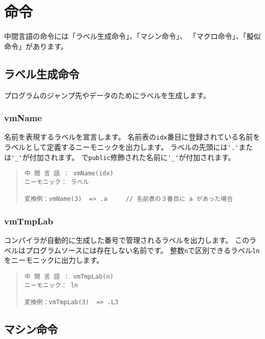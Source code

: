 \section{命令}

中間言語の命令には「ラベル生成命令」、「マシン命令」、
「マクロ命令」、「擬似命令」があります。

\subsection{ラベル生成命令}

プログラムのジャンプ先やデータのためにラベルを生成します。

\subsubsection{vmName}

名前を表現するラベルを宣言します。
名前表の\verb/idx/番目に登録されている名前を
ラベルとして定義するニーモニックを出力します。
ラベルの先頭には\verb/'.'/または\verb/'_'/が付加されます。
\cmml で\verb/public/修飾された名前に\verb/'_'/が付加されます。

\begin{quote}
\begin{verbatim}
中 間 言 語 ： vmName(idx)
ニーモニック： ラベル

変換例：vmName(3)  => .a     // 名前表の３番目に a があった場合
\end{verbatim}
\end{quote}

\subsubsection{vmTmpLab}

コンパイラが自動的に生成した番号で管理されるラベルを出力します。
このラベルは\cmm プログラムソースには存在しない名前です。
整数\verb/n/で区別できるラベル\verb/ln/をニーモニックに出力します。

\begin{quote}
\begin{verbatim}
中 間 言 語 ： vmTmpLab(n)
ニーモニック： ln

変換例：vmTmpLab(3)  => .L3
\end{verbatim}
\end{quote}

\subsection{マシン命令}

